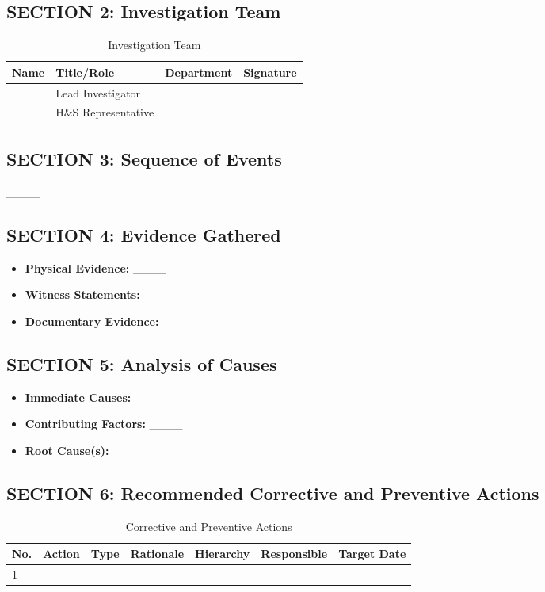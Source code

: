 \documentclass[12pt]{article}
\begin{document}
\subsection{SECTION 2: Investigation Team}
\begin{table}[h]
    \centering
    \begin{tabular}{p{3cm}p{3cm}p{3cm}p{3cm}}
        \toprule
        \textbf{Name} & \textbf{Title/Role} & \textbf{Department} & \textbf{Signature} \\
        \midrule
        & Lead Investigator & & \\
        & H\&S Representative & & \\
        \bottomrule
    \end{tabular}
    \caption{Investigation Team}
\end{table}

\subsection{SECTION 3: Sequence of Events}
\_\_\_\_

\subsection{SECTION 4: Evidence Gathered}
\begin{itemize}
    \item \textbf{Physical Evidence:} \_\_\_\_
    \item \textbf{Witness Statements:} \_\_\_\_
    \item \textbf{Documentary Evidence:} \_\_\_\_
\end{itemize}

\subsection{SECTION 5: Analysis of Causes}
\begin{itemize}
    \item \textbf{Immediate Causes:} \_\_\_\_
    \item \textbf{Contributing Factors:} \_\_\_\_
    \item \textbf{Root Cause(s):} \_\_\_\_
\end{itemize}

\subsection{SECTION 6: Recommended Corrective and Preventive Actions}
\begin{table}[h]
    \centering
    \begin{tabular}{p{1cm}p{3cm}p{2cm}p{3cm}p{2cm}p{2cm}p{2cm}}
        \toprule
        \textbf{No.} & \textbf{Action} & \textbf{Type} & \textbf{Rationale} & \textbf{Hierarchy} & \textbf{Responsible} & \textbf{Target Date} \\
        \midrule
        1 & & & & & & \\
        \bottomrule
    \end{tabular}
    \caption{Corrective and Preventive Actions}
\end{table}
\end{document}
